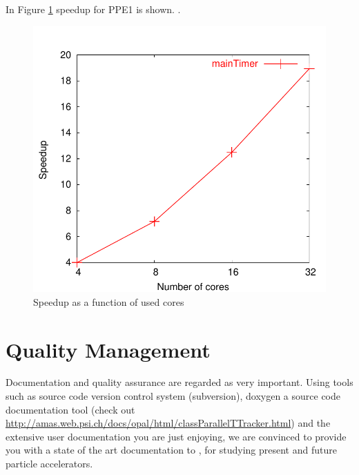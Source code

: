 In Figure \ref{fig:speedupdrift} speedup for PPE1 is shown. \latermore .

\begin{figure}[ht]
 \begin{center}
  \includegraphics[width=0.6\linewidth,angle=0]{figures/speedup/Drift/mainTimer-speedup}
  \caption{Speedup as a function of used cores}
   \label{fig:speedupdrift}
 \end{center}
\end{figure}

\section{Quality Management}
Documentation and quality assurance are regarded as very important. Using  tools such as source code version
control system (subversion),  doxygen a source code documentation tool (check out  \url{http://amas.web.psi.ch/docs/opal/html/classParallelTTracker.html}) and the extensive user documentation
you are just enjoying, we are convinced to provide you with a state of the art documentation to \opal, for studying present and future particle accelerators. 

